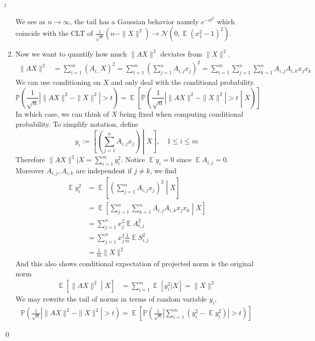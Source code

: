 \documentclass[12pt]{extarticle}
\renewenvironment{proof}[1][\proofname]{ { \it\bfseries #1: }}{\qed}
\newcommand{\cN}{{\mathcal{N}}}
\newcommand{\field}[1]{\mathbb{#1}}
\newcommand{\1}{\field{1}}
\newcommand{\p}{\field{P}}
\DeclareMathOperator{\E}{\mathbb{E}}
\numberwithin{equation}{section}
\begin{document}
\begin{proof}
\begin{enumerate}
We see as $n\to \infty$, the tail has a Gaussian behavior namely $e^{-ct^2}$ which coincide with the CLT of $\frac{1}{\sqrt{n}} \left( n - \|X\|^2 \right) \to \cN(0,\E(x_1^2-1)^2)$. 

\item 
Now we want to quantify how much $\|AX\|^2$ deviates from $\|X\|^2$. 
\begin{align*}
    \|AX\|^2 &= \sum_{i=1}^m (A_{i,.}X)^2
    = \sum_{i=1}^m \left(\sum_{j=1}^n A_{i,j}x_j \right)^2 
    = \sum_{i=1}^m \sum_{j=1}^n \sum_{k=1}^n A_{i,j} A_{i,k}x_jx_k 
\end{align*}
We can use conditioning on $X$ and only deal with the conditional probability.
\begin{equation}\label{eqn:concen split, conditioning on X}
    \p \left( \frac{1}{\sqrt{n}} \left| \|AX\|^2 - \|X\|^2 \right|> t \right) = \E \left[ \p \left( \frac{1}{\sqrt{n}} \left| \|AX\|^2 - \|X\|^2 \right|> t \middle| X \right)  \right]
\end{equation}
In which case, we can think of $X$ being fixed when computing conditional probability. To simplify notation, define 
 \[
 y_i := \left[ \left(\sum_{j=1}^n A_{i,j}x_j \right) \middle| X \right] ,  \quad 1\le i \le m
 \]
 Therefore $\|AX\|^2 |X = \sum_{i=1}^m y_i^2$. Notice $\E y_i =0$ since $\E A_{i,j}=0$.
Moreover $A_{i,j}, A_{i,k}$ are independent if $j\ne k$, we find
\begin{align*}
    \E y_i^2 
& = \E \left[ \left(\sum_{j=1}^n A_{i,j}x_j \right)^2 \middle| X \right] \\
& = \E \left[ \sum_{j=1}^n\sum_{k=1}^n A_{i,j} A_{i,k} x_j x_k  \middle| X \right] \\
& = \sum_{j=1}^n x_j^2\E A_{i,j}^2  \\
&=  \sum_{j=1}^n x_j^2 \frac{1}{m}\E S_{i,j}^2 \\
&= \frac{1}{m} \|X\|^2
\end{align*}
And this also shows conditional expectation of projected norm is the original norm
\begin{align*}
    \E \left[\|AX\|^2  \middle| X \right]
    &= \sum_{i=1}^m \E [y_i^2|X]  
    = \|X \|^2 
\end{align*}
We may rewrite the tail of norms in terms of random variable $y_i$,
\begin{align*}
    \p \left( \frac{1}{\sqrt{n}} \left| \|AX\|^2 - \|X\|^2 \right|> t \right) = \E \left[ \p \left( \frac{1}{\sqrt{n}} \left|  \sum_{i=1}^m (y_i^2 - \E y_i^2)\right|> t  \right)  \right]
\end{align*}
 

\end{enumerate}
\end{proof}
\end{document}
